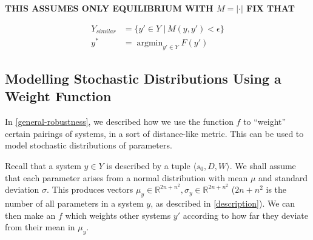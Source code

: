 \documentclass{article}
\DeclareMathOperator*{\argmin}{argmin}
\begin{document}
\textbf{THIS ASSUMES ONLY EQUILIBRIUM WITH $M = \lvert \cdot \rvert$ FIX THAT}

\begin{align}
  Y_{similar} &= \{y' \in Y \,\,|\, M(y, y') < \epsilon \} \\
  y^* &= \argmin_{y' \in Y} F(y')
\end{align}

\subsection{Modelling Stochastic Distributions Using a Weight Function}
In \ref{general-robustness}, we described how we use the function $f$ to ``weight'' certain pairings of systems, in a sort of distance-like metric. This can be used to model stochastic distributions of parameters.

Recall that a system $y \in Y$ is described by a tuple $\langle s_0, D, W \rangle$. We shall assume that each parameter arises from a normal distribution with mean $\mu$ and standard deviation $\sigma$. This produces vectors $\mu_y \in \mathbb{R}^{2n + n^2}, \sigma_y \in \mathbb{R}^{2n + n^2}$ ($2n + n^2$ is the number of all parameters in a system $y$, as described in \ref{description}). We can then make an $f$ which weights other systems $y'$ according to how far they deviate from their mean in $\mu_y$.
\end{document}
